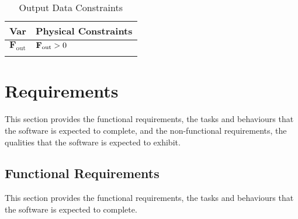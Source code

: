 \documentclass[12pt]{article}
\newcommand{\gt}{\ensuremath >}
\begin{document}
\begin{longtable}{l l}
\toprule
\textbf{Var} & \textbf{Physical Constraints}
\\
\midrule
\endhead
${\mathbf{F}_{\text{out}}}$ & ${\mathbf{F}_{\text{out}}}\gt{}0$
\\
\bottomrule
\caption{Output Data Constraints}
\label{Table:OutDataConstraints}
\end{longtable}
\section{Requirements}
\label{Sec:Requirements}
This section provides the functional requirements, the tasks and behaviours that the software is expected to complete, and the non-functional requirements, the qualities that the software is expected to exhibit.

\subsection{Functional Requirements}
\label{Sec:FRs}
This section provides the functional requirements, the tasks and behaviours that the software is expected to complete.
\end{document}
